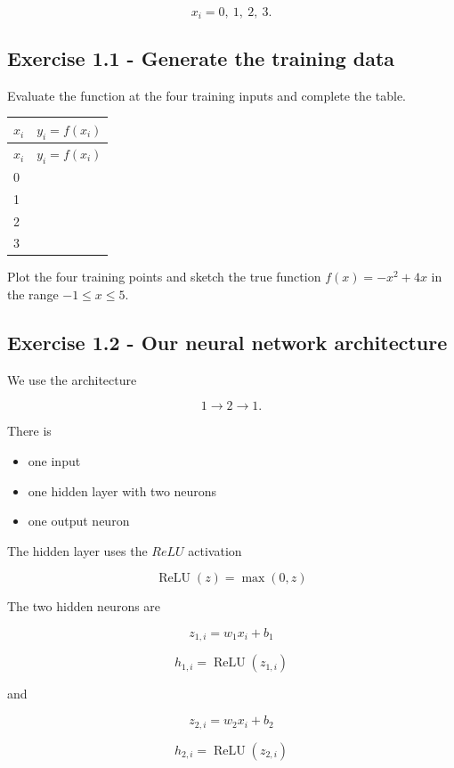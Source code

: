 \documentclass{course_sheet}
\begin{document}
\[
x_i=0,\ 1,\ 2,\ 3.
\]

\subsection*{Exercise 1.1 - Generate the training data}
Evaluate the function at the four training inputs and complete the table.

\begingroup
\small
\setlength{\tabcolsep}{4pt}
\begin{longtable}{l|l}
$x_i$ & $y_i=f(x_i)$ \\[1.5pt]
\hline
\endfirsthead
$x_i$ & $y_i=f(x_i)$ \\[1.5pt]
\hline
\endhead
\rule{0pt}{2.4ex}0 &  $\phantom{-0.00}$ \\[3pt]
\rule{0pt}{2.4ex}1 &  $\phantom{-0.00}$ \\[3pt]
\rule{0pt}{2.4ex}2 &  $\phantom{-0.00}$ \\[3pt]
\rule{0pt}{2.4ex}3 &  $\phantom{-0.00}$ \\[3pt]
\end{longtable}
\endgroup
Plot the four training points and sketch the true function $f(x)=-x^2+4x$ in the range $-1\leq x\leq5$.

\subsection*{Exercise 1.2 - Our neural network architecture}
We use the architecture

\[
1\rightarrow2\rightarrow1.
\]

There is

\begin{itemize}
\item
one input

\item
one hidden layer with two neurons

\item
one output neuron

\end{itemize}
The hidden layer uses the $ReLU$ activation

\[
\operatorname{ReLU}(z)=\max(0,z)
\]

The two hidden neurons are

\[
z_{1,i}=w_1x_i+b_1
\]

\[
h_{1,i}=\operatorname{ReLU}(z_{1,i})
\]

and

\[
z_{2,i}=w_2x_i+b_2
\]

\[
h_{2,i}=\operatorname{ReLU}(z_{2,i})
\]
\end{document}
